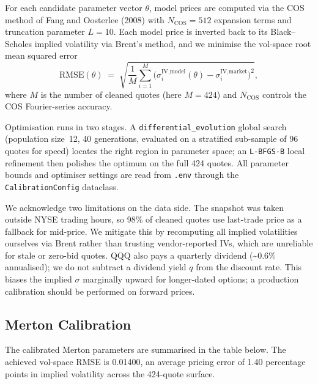 \documentclass[11pt,a4paper]{article}
\begin{document}
For each candidate parameter vector $\theta$, model prices are computed
via the COS method of Fang and Oosterlee (2008) with
$N_{\text{COS}} = 512$ expansion terms and truncation parameter
$L = 10$. Each model price is inverted back to its Black--Scholes
implied volatility via Brent's method, and we minimise the vol-space
root mean squared error
\[
   \text{RMSE}(\theta) \;=\;
   \sqrt{\frac{1}{M}\sum_{i=1}^{M}
            \bigl( \sigma^{\text{IV},\text{model}}_i(\theta)
                   - \sigma^{\text{IV},\text{market}}_i \bigr)^{\!2}},
\]
where $M$ is the number of cleaned quotes (here $M = 424$) and
$N_{\text{COS}}$ controls the COS Fourier-series accuracy.

Optimisation runs in two stages. A \texttt{differential\_evolution}
global search (population size~12, 40 generations, evaluated on a
stratified sub-sample of 96 quotes for speed) locates the right region
in parameter space; an \texttt{L-BFGS-B} local refinement then polishes
the optimum on the full 424 quotes. All parameter bounds and optimiser
settings are read from \texttt{.env} through the
\texttt{CalibrationConfig} dataclass.

We acknowledge two limitations on the data side. The snapshot was taken
outside NYSE trading hours, so 98\% of cleaned quotes use last-trade
price as a fallback for mid-price. We mitigate this by recomputing all
implied volatilities ourselves via Brent rather than trusting
vendor-reported IVs, which are unreliable for stale or zero-bid quotes.
QQQ also pays a quarterly dividend (\textasciitilde$0.6\%$ annualised);
we do not subtract a dividend yield $q$ from the discount rate. This
biases the implied $\sigma$ marginally upward for longer-dated options;
a production calibration should be performed on forward prices.


\subsection*{Merton Calibration}

The calibrated Merton parameters are summarised in the table below.
The achieved vol-space RMSE is 0.01400, an average pricing error of
1.40 percentage points in implied volatility across the 424-quote
surface.
\end{document}
